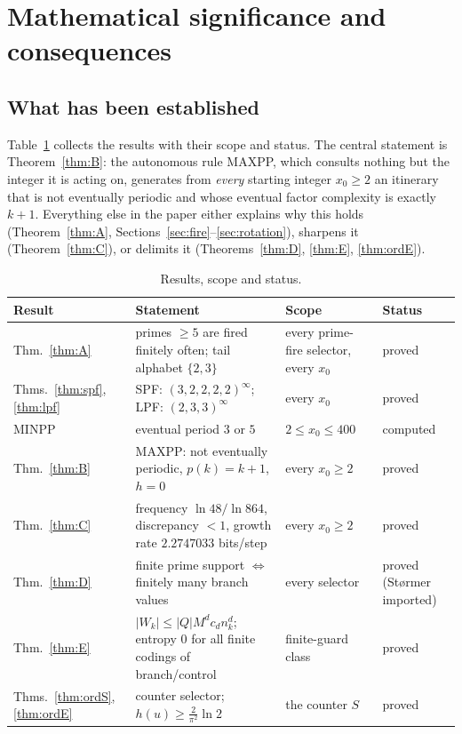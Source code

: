 
\section{Mathematical significance and consequences}\label{sec:signif}
\subsection{What has been established}
Table~\ref{tab:results} collects the results with their scope and status. The central statement is Theorem~\ref{thm:B}: the autonomous rule \textsf{MAXPP}, which consults nothing but the integer it is acting on, generates from \emph{every} starting integer $x_0\ge2$ an itinerary that is not eventually periodic and whose eventual factor complexity is exactly $k+1$. Everything else in the paper either explains why this holds (Theorem~\ref{thm:A}, Sections~\ref{sec:fire}--\ref{sec:rotation}), sharpens it (Theorem~\ref{thm:C}), or delimits it (Theorems~\ref{thm:D}, \ref{thm:E}, \ref{thm:ordE}).
\begin{table}[H]\centering\small
\begin{tabular}{@{}p{}p{}p{}p{}@{}}\toprule
Result & Statement & Scope & Status\\\midrule
Thm.~\ref{thm:A} & primes $\ge5$ are fired finitely often; tail alphabet $\{2,3\}$ & every prime-fire selector, every $x_0$ & proved\\
Thms.~\ref{thm:spf}, \ref{thm:lpf} & \textsf{SPF}: $(3,2,2,2,2)^\infty$; \textsf{LPF}: $(2,3,3)^\infty$ & every $x_0$ & proved\\
\textsf{MINPP} & eventual period $3$ or $5$ & $2\le x_0\le400$ & computed\\
Thm.~\ref{thm:B} & \textsf{MAXPP}: not eventually periodic, $p(k)=k+1$, $h=0$ & every $x_0\ge2$ & proved\\
Thm.~\ref{thm:C} & frequency $\ln48/\ln864$, discrepancy $<1$, growth rate $2.2747033$ bits/step & every $x_0\ge2$ & proved\\
Thm.~\ref{thm:D} & finite prime support $\iff$ finitely many branch values & every selector & proved (Størmer imported)\\
Thm.~\ref{thm:E} & $|W_k|\le|Q|M^dc_dn_k^d$; entropy $0$ for all finite codings of branch/control & finite-guard class & proved\\
Thms.~\ref{thm:ordS}, \ref{thm:ordE} & counter selector; $h(u)\ge\frac2{\pi^2}\ln2$ & the counter $S$ & proved\\
\bottomrule\end{tabular}
\caption{Results, scope and status.}\label{tab:results}\end{table}

